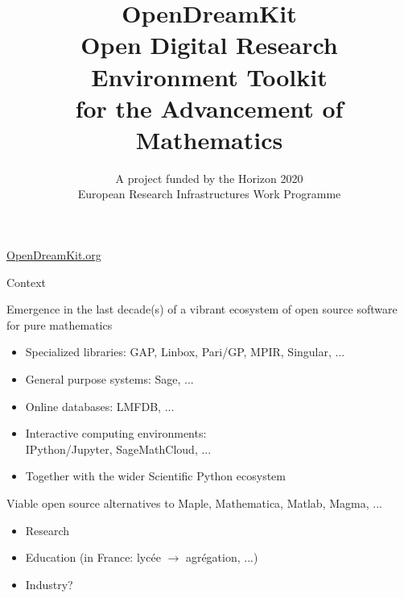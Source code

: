 \documentclass[
  usenames,svgnames, %
  compress,
  ]{beamer}
\title{{\huge \color{red} OpenDreamKit}\\
  Open Digital Research Environment Toolkit\\
  for the Advancement of Mathematics\\}
\subtitle{A project funded by the Horizon 2020\\
  European Research Infrastructures Work Programme}
\begin{document}
\begin{frame}
  \maketitle

  \Huge
  \centerline{\url{OpenDreamKit.org}}
\end{frame}


\begin{frame}{Context}
  \begin{block}{Emergence in the last decade(s) of a vibrant ecosystem
      of open source software for pure mathematics}

    \begin{itemize}
    \item Specialized libraries: GAP, Linbox, Pari/GP, MPIR, Singular,
      ...
    \item General purpose systems: Sage, ...
    \item Online databases: LMFDB, ...
    \item Interactive computing environments:\\
      IPython/Jupyter, SageMathCloud, ...
    \item Together with the wider Scientific Python ecosystem
    \end{itemize}
  \end{block}
  \bigskip

  \begin{block}{Viable open source alternatives to Maple, Mathematica,
      Matlab, Magma, ...}
    \begin{itemize}
    \item Research
    \item Education (in France: lycée $\longrightarrow$ agrégation, ...)
    \item Industry?
    \end{itemize}
  \end{block}
\end{frame}
\end{document}
